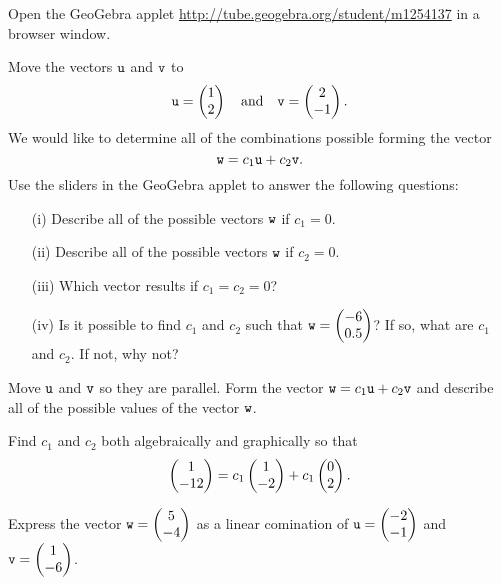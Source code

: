 % 
\begin{problem}
    Open the GeoGebra applet
    \href{http://tube.geogebra.org/student/m1254137}{http://tube.geogebra.org/student/m1254137} in a browser window.
    \ba
        \item Move the vectors $\texttt{u}$ and $\texttt{v}$ to 
            \[ \texttt{u} = \begin{pmatrix} 1 \\ 2 \end{pmatrix} \quad \text{and} \quad \texttt{v} = \begin{pmatrix} 2 \\ -1 \end{pmatrix}. \]
            We would like to determine all of the combinations possible forming the vector
            \[ \texttt{w} = c_1 \texttt{u} + c_2 \texttt{v}. \]
            Use the sliders in the GeoGebra applet to answer the following questions:
            \begin{enumerate}
                \item[(i)] Describe all of the possible vectors $\texttt{w}$ if $c_1=0$.
                \item[(ii)] Describe all of the possible vectors $\texttt{w}$ if $c_2=0$.
                \item[(iii)] Which vector results if $c_1=c_2=0$?
                \item[(iv)] Is it possible to find $c_1$ and $c_2$ such that $\texttt{w} = \begin{pmatrix}
                    -6 \\ 0.5 \end{pmatrix}$?  If so, what are $c_1$ and $c_2$.  If not, why not?
            \end{enumerate}
        \item Move $\texttt{u}$ and $\texttt{v}$ so they are parallel.  Form the vector $\texttt{w} = c_1 \texttt{u} +
            c_2 \texttt{v}$ and describe all of the possible values of the vector $\texttt{w}$.
        \item Find $c_1$ and $c_2$ both algebraically and graphically so that
            \[ \begin{pmatrix} 1 \\ -12 \end{pmatrix} = c_1 \begin{pmatrix} 1 \\ -2 \end{pmatrix} + c_1 \begin{pmatrix} 0 \\ 2 \end{pmatrix}. \]

        \item Express the vector $\texttt{w} = \begin{pmatrix} 5 \\ -4 \end{pmatrix}$ as a linear comination of $\texttt{u} =
    \begin{pmatrix} -2 \\ -1 \end{pmatrix}$ and $\texttt{v} = \begin{pmatrix} 1 \\ -6 \end{pmatrix}$.  
    \ea

\end{problem}




